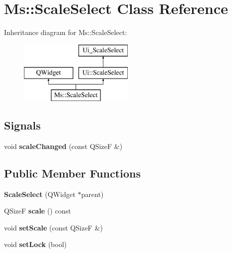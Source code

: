 \hypertarget{class_ms_1_1_scale_select}{}\section{Ms\+:\+:Scale\+Select Class Reference}
\label{class_ms_1_1_scale_select}
Inheritance diagram for Ms\+:\+:Scale\+Select\+:\begin{figure}[H]
\begin{center}
\leavevmode
\includegraphics[height=3.000000cm]{class_ms_1_1_scale_select}
\end{center}
\end{figure}
\subsection*{Signals}
\begin{DoxyCompactItemize}
\item 
\mbox{\label{class_ms_1_1_scale_select_a3cd1d11027a5a04fb8299007b6c00fe9}} 
void {\bfseries scale\+Changed} (const Q\+SizeF \&)
\end{DoxyCompactItemize}
\subsection*{Public Member Functions}
\begin{DoxyCompactItemize}
\item 
\mbox{\label{class_ms_1_1_scale_select_a629599ff7c539c2e6dd9637f339cd554}} 
{\bfseries Scale\+Select} (Q\+Widget $\ast$parent)
\item 
\mbox{\label{class_ms_1_1_scale_select_ac56d5813048136689807788372032cf8}} 
Q\+SizeF {\bfseries scale} () const
\item 
\mbox{\label{class_ms_1_1_scale_select_afd1e7daa4f2328b723597ed453e637e5}} 
void {\bfseries set\+Scale} (const Q\+SizeF \&)
\item 
\mbox{\label{class_ms_1_1_scale_select_a46b13635c29fb4bf7ab15d108be279b2}} 
void {\bfseries set\+Lock} (bool)
\end{DoxyCompactItemize}
